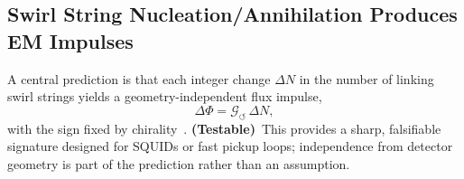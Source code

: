 \documentclass[10pt,reprint,aps,onecolumn,nofootinbib]{revtex4-2}
\newcommand{\testable}{\textbf{(Testable)}}
\begin{document}
    \subsection*{Swirl String Nucleation/Annihilation Produces EM Impulses}\label{subsec:em_g}
        A central prediction is that each integer change $\Delta N$ in the number of linking swirl strings yields a geometry-independent flux impulse,
        \[
            \Delta\Phi = \mathcal{G}_{\circlearrowleft} \,\Delta N,
        \]
        with the sign fixed by chirality~\cite{EM_G}. \testable\ This provides a sharp, falsifiable signature designed for SQUIDs or fast pickup loops; independence from detector geometry is part of the prediction rather than an assumption.


    \begin{figure*}[htbp]
    \centering
    \begin{adjustbox}{max width=0.9\textwidth}
\end{adjustbox}
\end{figure*}
\end{document}
